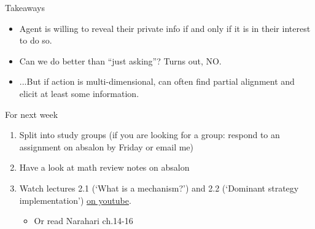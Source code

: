 \documentclass[english,10pt
,aspectratio=169
]{beamer}
\begin{document}
\begin{frame}{Takeaways}
	\begin{itemize}
		\item Agent is willing to reveal their private info if and only if it is in their interest to do so.
		\bigskip 
		\item Can we do better than ``just asking''? Turns out, NO.
		\item ...But if action is multi-dimensional, can often find partial alignment and elicit at least some information.
	\end{itemize}
\end{frame}


\begin{frame}{For next week}
	\begin{enumerate}
		\item Split into study groups (if you are looking for a group: respond to an assignment on absalon by Friday or email me)
		\item Have a look at math review notes on absalon
		\item Watch lectures 2.1 (`What is a mechanism?') and 2.2 (`Dominant strategy implementation') \href{https://www.youtube.com/playlist?list=PL4pUs4P_j1WasI0kO99OgNNd_hJwpct4D}{\uline{on youtube}}.
		\begin{itemize}
			\item Or read Narahari ch.14-16
		\end{itemize}
	\end{enumerate}
\end{frame}


%	
%	
\end{document}
